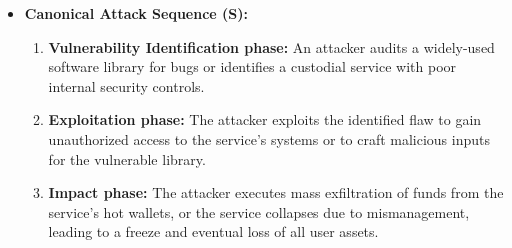 \begin{itemize}
    \item \textbf{Canonical Attack Sequence (S):}
        \begin{enumerate}
            \item \textbf{Vulnerability Identification phase:} An attacker audits a widely-used software library for bugs or identifies a custodial service with poor internal security controls.
            \item \textbf{Exploitation phase:} The attacker exploits the identified flaw to gain unauthorized access to the service's systems or to craft malicious inputs for the vulnerable library.
            \item \textbf{Impact phase:} The attacker executes mass exfiltration of funds from the service's hot wallets, or the service collapses due to mismanagement, leading to a freeze and eventual loss of all user assets.
        \end{enumerate}
\end{itemize}

